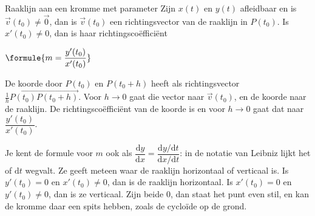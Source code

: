 \begin{theorie}
\begin{minipage}[t]{.62\linewidth}
\vspace{0pt}
\begin{stelling}{Raaklijn aan een kromme met parameter}
Zijn $x(t)$ en $y(t)$ afleidbaar en is $\vec v(t_0) \neq \vec 0$, dan is $\vec v(t_0)$ een richtingsvector van de raaklijn in $P(t_0)$. Is $x'(t_0) \neq 0$, dan is haar richtingscoëfficiënt

\vspace{1mm}
\qquad $\formule{m = \dfrac{y'(t_0)}{x'(t_0)}}$
\end{stelling}

\begin{bewijs}
De koorde door $P(t_0)$ en $P(t_0 + h)$ heeft als richtingsvector $\tfrac1h\overrightarrow{P(t_0)P(t_0+h)}$. Voor $h \to 0$ gaat die vector naar $\vec v(t_0)$, en de koorde naar de raaklijn. De richtingscoëfficiënt van de koorde is
en voor $h \to 0$ gaat dat naar $\dfrac{y'(t_0)}{x'(t_0)}$.
\end{bewijs}
\end{minipage}\hfill
\begin{minipage}[t]{.34\linewidth}
\vspace{5mm}
\centering
{}
\end{minipage}
\end{theorie}

Je kent de formule voor $m$ ook als $\dfrac{\mathrm{d}y}{\mathrm{d}x} = \dfrac{\mathrm{d}y/\mathrm{d}t}{\mathrm{d}x/\mathrm{d}t}$: in de notatie van Leibniz lijkt het of $\mathrm{d}t$ wegvalt. Ze geeft meteen waar de raaklijn horizontaal of verticaal is. Is $y'(t_0) = 0$ en $x'(t_0) \neq 0$, dan is de raaklijn horizontaal. Is $x'(t_0) = 0$ en $y'(t_0) \neq 0$, dan is ze verticaal. Zijn beide 0, dan staat het punt even stil, en kan de kromme daar een spits hebben, zoals de cycloïde op de grond.

